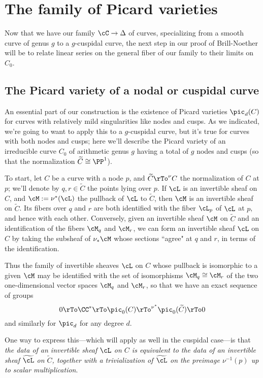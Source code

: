 \section{The family of Picard varieties}

Now that we have our family $\cC \to \Delta$ of curves, specializing from a smooth curve of genus $g$ to a $g$-cuspidal curve, the next step in our proof of Brill-Noether will be to relate linear series on the general fiber of our family to their limits on $C_0$.

\subsection{The Picard variety of a nodal or cuspidal curve}

An essential part of our construction is the existence of Picard varieties $\pic_d(C)$ for curves with relatively mild singularities like nodes and cusps. As we indicated, we're going to want to apply this to a $g$-cuspidal curve, but it's true for curves with both nodes and cusps; here we'll describe the Picard variety of an irreducible curve $C_0$ of arithmetic genus $g$ having a total of $g$ nodes and cusps (so that the normalization $\widetilde C \cong \PP^1$).

To start, let $C$ be a curve with a node $p$, and $\widetilde C \rTo^\nu C$ the normalization of $C$ at $p$; we'll denote by $q,r \in \widetilde C$ the points lying over $p$. If $\cL$ is an invertible sheaf on $C$, and $\cM := \nu^*(\cL)$ the pullback of $\cL$ to $\widetilde C$, then $\cM$ is an invertible sheaf on $\widetilde C$. Its fibers over $q$ and $r$ are both identified with the fiber $\cL_p$ of $\cL$ at $p$, and hence with each other. Conversely, given an invertible sheaf $\cM$ on $\widetilde C$ and an identification of the fibers $\cM_q$ and $\cM_r$, we can form an invertible sheaf $\cL$ on $C$ by taking the subsheaf of $\nu_*\cM$ whose sections ``agree" at $q$ and $r$, in terms of the identification. 

Thus the family of invertible sheaves $\cL$ on $C$ whose pullback is isomorphic to a given $\cM$ may be identified with the set of isomorphisms $\cM_q \cong \cM_r$ of the two one-dimensional vector spaces $\cM_q$ and $\cM_r$, so that  we have an exact sequence of groups
$$
0 \rTo  \CC^* \rTo \pic_0(C) \rTo^{\nu^*}  \pic_0(\widetilde C) \rTo 0
$$
and similarly for $\pic_d$ for any degree $d$.

One way to express this---which will apply as well in the cuspidal case---is that \emph{the data of an invertible sheaf $\cL$ on $C$ is equivalent to the data of an invertible sheaf $\widetilde \cL$ on $\widetilde C$, together with a trivialization of $\widetilde \cL$ on the preimage $\nu^{-1}(p)$ up to scalar multiplication}.



